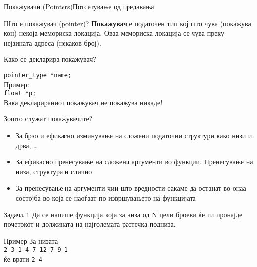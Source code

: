 

\begin{frame}[fragile,shrink=10]{Покажувачи (Pointers)}{Потсетување од
предавања}
  \begin{block}{Што е покажувач (pointer)?}
    \textbf{Покажувач} е \alert{податочен тип} кој што чува (покажува кон)
    некоја мемориска локација. Оваа мемориска локација се чува преку нејзината адреса (некаков
    број).
  \end{block}
  \begin{block}{Како се декларира покажувач?}
  
    \texttt{pointer\_type *name;}\\
    Пример:\\
    \texttt{float *p;}\\
    \alert{Вака декларираниот покажувач не покажува никаде!}
  \end{block}
  \begin{block}{Зошто служат покажувачите?}
    \begin{itemize}
      \item За брзо и ефикасно изминување на сложени податочни структури како
      низи и дрва, \ldots
      \item За ефикасно пренесување на сложени аргументи во функции. Пренесување
      на низа, структура и слично
      \item За пренесување на аргументи чии што вредности сакаме да останат во
      онаа состојба во која се наоѓаат по извршувањето на функцијата
    \end{itemize}
  \end{block}
  
\end{frame}

\begin{frame}{Задачa 1}
Да се напише функција која за низа од N цели броеви ќе ги пронајде почетокот и
должината на најголемата растечка подниза.
\begin{exampleblock}{Пример}
За низата\\
\texttt{2 3 {\color{red}1 4 7 12} 7 9 1}\\
ќе врати \texttt{2 4}
\end{exampleblock}
\end{frame}

